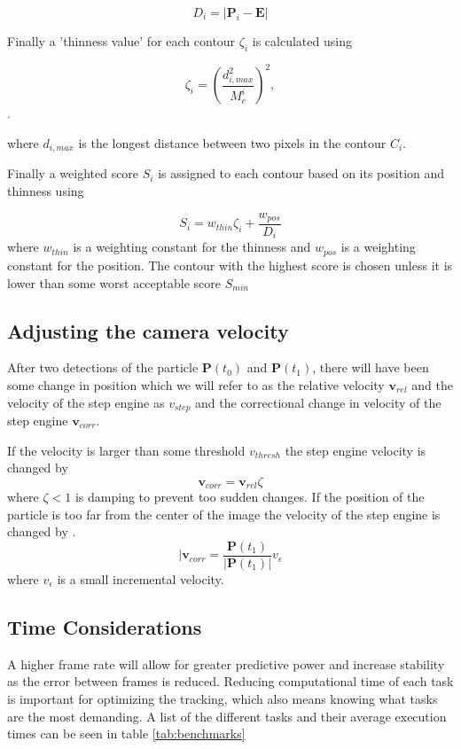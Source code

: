 \[
D_i = \left|\mathbf{P}_i - \mathbf{E}\right|
\]

Finally a 'thinness value' for each contour $\zeta_i$ is calculated using

\begin{equation}\label{eq:thinness}
\zeta_i =  \left(\frac{d_{i, max}^2}{M_c^i}\right)^2,
\end{equation}. 

where $d_{i,max}$ is the longest distance between two pixels in the contour $C_i$.

Finally a weighted score $S_i$ is assigned to each contour based on its position and thinness using

\begin{equation}
S_i = w_{thin}\zeta_i + \frac{w_{pos}}{D_i}
\end{equation}
\noindent where $w_{thin}$ is a weighting constant for the thinness and $w_{pos}$ is a weighting constant for the position. The contour with the highest score is chosen unless it is lower than some worst acceptable score $S_{min}$

\subsection{Adjusting the camera velocity}
After two detections of the particle $\mathbf{P}(t_0)$ and $\mathbf{P}(t_1)$, there will have been some change in position which we will refer to as the relative velocity $\mathbf{v}_{rel}$ and the velocity of the step engine as $v_{step}$ and the correctional change in velocity of the step engine $\mathbf{v}_{corr}$.

If the velocity is larger than some threshold $v_{thresh}$ the step engine velocity is changed by
\[
\mathbf{v}_{corr} = \mathbf{v}_{rel}\zeta
\]
where $\zeta < 1$ is damping to prevent too sudden changes. If the position of the particle is too far from the center of the image the velocity of the step engine is changed by .
\[|
\mathbf{v}_{corr} = \frac{\mathbf{P}(t_1)}{\left|\mathbf{P}(t_1)\right|}v_{\epsilon}
\] 
where $v_{\epsilon}$ is a small incremental velocity.


\subsection{Time Considerations}\label{sec:time considerations}
A higher frame rate will allow for greater predictive power and increase stability as the error between frames is 
reduced. Reducing computational time of each task is important for optimizing the tracking, which also means knowing 
what tasks are the most demanding. A list of the different tasks and their average execution times can be seen in table 
\ref{tab:benchmarks}


